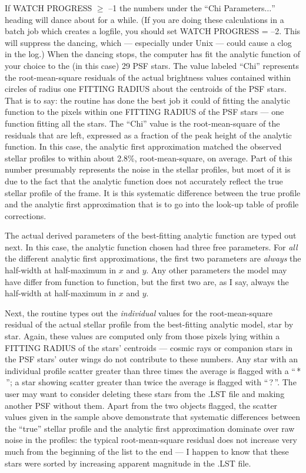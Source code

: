If WATCH PROGRESS $\geq$ --1 the numbers under the ``Chi
Parameters$\ldots$'' heading will dance about for a while.  (If you are
doing these calculations in a batch job which creates a logfile, you
should set WATCH PROGRESS = --2.  This will suppress the dancing, which
--- especially under Unix --- could cause a clog in the log.)  When the
dancing stops, the computer has fit the analytic function of your
choice to the (in this case) 29 PSF stars.  The value labeled ``Chi''
represents the root-mean-square residuals of the actual brightness
values contained within circles of radius one FITTING RADIUS about the
centroids of the PSF stars.  That is to say:  the routine has done the
best job it could of fitting the analytic function to the pixels within
one FITTING RADIUS of the PSF stars --- one function fitting all the
stars.  The ``Chi'' value is the root-mean-square of the residuals that
are left, expressed as a fraction of the peak height of the analytic
function.  In this case, the analytic first approximation matched the
observed stellar profiles to within about 2.8\%, root-mean-square, on
average.  Part of this number presumably represents the noise in the
stellar profiles, but most of it is due to the fact that the analytic
function does not accurately reflect the true stellar profile of the
frame.  It is this systematic difference between the true profile and
the analytic first approximation that is to go into the look-up table
of profile corrections.

The actual derived parameters of the best-fitting analytic function are
typed out next.  In this case, the analytic function chosen had three
free parameters.  For {\it all\/} the different analytic first
approximations, the first two parameters are {\it always\/} the
half-width at half-maximum in $x$ and $y$.  Any other parameters the
model may have differ from function to function, but the first two are,
as I say, always the half-width at half-maximum in $x$ and $y$.

Next, the routine types out the {\it individual\/} values for the
root-mean-square residual of the actual stellar profile from the
best-fitting analytic model, star by star.  Again, these values are
computed only from those pixels lying within a FITTING RADIUS of the
stars' centroids --- cosmic rays or companion stars in the PSF stars'
outer wings do not contribute to these numbers.  Any star with an
individual profile scatter greater than three times the average is
flagged with a ``$\,$*$\,$'';  a star showing scatter greater than
twice the average is flagged with ``$\,$?$\,$''.  The user may want to
consider deleting these stars from the .LST file and making another PSF
without them.  Apart from the two objects flagged, the scatter values
given in the sample above demonstrate that systematic differences
between the ``true'' stellar profile and the analytic first
approximation dominate over raw noise in the profiles:  the typical
root-mean-square residual does not increase very much from the
beginning of the list to the end --- I happen to know that these stars
were sorted by increasing apparent magnitude in the .LST file.

